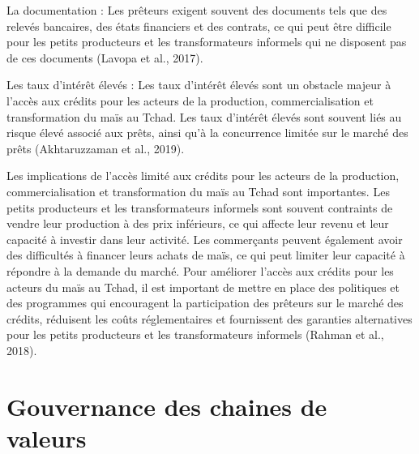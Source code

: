 \documentclass[12pt,oneside]{report}
\begin{document}
La documentation : Les prêteurs exigent souvent des documents tels que des relevés bancaires, des états financiers et des contrats, ce qui peut être difficile pour les petits producteurs et les transformateurs informels qui ne disposent pas de ces documents (Lavopa et al., 2017).

Les taux d'intérêt élevés : Les taux d'intérêt élevés sont un obstacle majeur à l'accès aux crédits pour les acteurs de la production, commercialisation et transformation du maïs au Tchad. Les taux d'intérêt élevés sont souvent liés au risque élevé associé aux prêts, ainsi qu'à la concurrence limitée sur le marché des prêts (Akhtaruzzaman et al., 2019).

Les implications de l'accès limité aux crédits pour les acteurs de la production, commercialisation et transformation du maïs au Tchad sont importantes. Les petits producteurs et les transformateurs informels sont souvent contraints de vendre leur production à des prix inférieurs, ce qui affecte leur revenu et leur capacité à investir dans leur activité. Les commerçants peuvent également avoir des difficultés à financer leurs achats de maïs, ce qui peut limiter leur capacité à répondre à la demande du marché. Pour améliorer l'accès aux crédits pour les acteurs du maïs au Tchad, il est important de mettre en place des politiques et des programmes qui encouragent la participation des prêteurs sur le marché des crédits, réduisent les coûts réglementaires et fournissent des garanties alternatives pour les petits producteurs et les transformateurs informels (Rahman et al., 2018).

\section{Gouvernance des chaines de valeurs}
\end{document}
